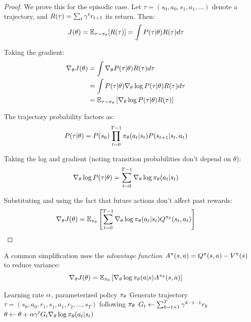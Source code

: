 \begin{proof}
We prove this for the episodic case. Let $\tau = (s_0, a_0, s_1, a_1, \ldots)$ denote a trajectory, and $R(\tau) = \sum_t \gamma^t r_{t+1}$ its return. Then:
\begin{equation}
J(\theta) = \mathbb{E}_{\tau \sim \pi_\theta}[R(\tau)] = \int P(\tau|\theta) R(\tau) d\tau
\end{equation}

Taking the gradient:
\begin{align}
\nabla_\theta J(\theta) &= \int \nabla_\theta P(\tau|\theta) R(\tau) d\tau \\
&= \int P(\tau|\theta) \nabla_\theta \log P(\tau|\theta) R(\tau) d\tau \\
&= \mathbb{E}_{\tau \sim \pi_\theta} \left[ \nabla_\theta \log P(\tau|\theta) R(\tau) \right]
\end{align}

The trajectory probability factors as:
\begin{equation}
P(\tau|\theta) = P(s_0) \prod_{t=0}^{T-1} \pi_\theta(a_t|s_t) P(s_{t+1}|s_t, a_t)
\end{equation}

Taking the log and gradient (noting transition probabilities don't depend on $\theta$):
\begin{equation}
\nabla_\theta \log P(\tau|\theta) = \sum_{t=0}^{T-1} \nabla_\theta \log \pi_\theta(a_t|s_t)
\end{equation}

Substituting and using the fact that future actions don't affect past rewards:
\begin{equation}
\nabla_\theta J(\theta) = \mathbb{E}_{\pi_\theta} \left[ \sum_{t=0}^{T-1} \nabla_\theta \log \pi_\theta(a_t|s_t) Q^{\pi_\theta}(s_t, a_t) \right]
\end{equation}
\end{proof}

A common simplification uses the \textit{advantage function} $A^\pi(s,a) = Q^\pi(s,a) - V^\pi(s)$ to reduce variance:
\begin{equation}
\nabla_\theta J(\theta) = \mathbb{E}_{\pi_\theta} \left[ \nabla_\theta \log \pi_\theta(a|s) A^{\pi_\theta}(s, a) \right]
\label{eq:policy_gradient_advantage}
\end{equation}

\begin{algorithm}[htbp]
\caption{REINFORCE Algorithm (Monte Carlo Policy Gradient)}
\label{alg:reinforce}
\begin{algorithmic}[1]
\Require Learning rate $\alpha$, parameterized policy $\pi_\theta$
    \State Generate trajectory $\tau = (s_0, a_0, r_1, s_1, a_1, r_2, \ldots, s_T)$ following $\pi_\theta$
        \State $G_t \leftarrow \sum_{k=t+1}^{T} \gamma^{k-t-1} r_k$ 
        \State $\theta \leftarrow \theta + \alpha \gamma^t G_t \nabla_\theta \log \pi_\theta(a_t|s_t)$
    \EndFor
\EndFor
\end{algorithmic}
\end{algorithm}

